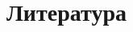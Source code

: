 \documentclass[]{article}
\begin{document}
			\section{Литература}
			\renewcommand{\refname}{}
			\vspace{-25pt}
			
			
						
\end{document}
